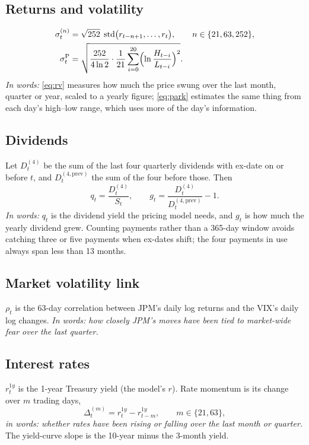 \documentclass[11pt]{article}
\begin{document}
\subsection{Returns and volatility}
\begin{align}
  \sigma^{(n)}_t &= \sqrt{252}\;\operatorname{std}\bigl(r_{t-n+1},\dots,r_t\bigr), \qquad n \in \{21, 63, 252\}, \label{eq:rv}\\
  \sigma^{\mathrm{P}}_t &= \sqrt{\frac{252}{4\ln 2}\cdot\frac{1}{21}\sum_{i=0}^{20}\Bigl(\ln\frac{H_{t-i}}{L_{t-i}}\Bigr)^{2}}. \label{eq:park}
\end{align}
\emph{In words:} \eqref{eq:rv} measures how much the price swung over the last month, quarter or year, scaled to a
yearly figure; \eqref{eq:park} estimates the same thing from each day's high--low range, which uses more of the
day's information.

\subsection{Dividends}
Let $D^{(4)}_t$ be the sum of the last four quarterly dividends with ex-date on or before $t$, and $D^{(4,\text{prev})}_t$
the sum of the four before those. Then
\begin{equation}
  q_t = \frac{D^{(4)}_t}{S_t}, \qquad g_t = \frac{D^{(4)}_t}{D^{(4,\text{prev})}_t} - 1.
\end{equation}
\emph{In words:} $q_t$ is the dividend yield the pricing model needs, and $g_t$ is how much the yearly dividend grew.
Counting payments rather than a 365-day window avoids catching three or five payments when ex-dates shift; the four
payments in use always span less than 13 months.

\subsection{Market volatility link}
$\rho_t$ is the 63-day correlation between JPM's daily log returns and the VIX's daily log changes.
\emph{In words: how closely JPM's moves have been tied to market-wide fear over the last quarter.}

\subsection{Interest rates}
$r^{1y}_t$ is the 1-year Treasury yield (the model's $r$). Rate momentum is its change over $m$ trading days,
\begin{equation}
  \Delta^{(m)}_t = r^{1y}_t - r^{1y}_{t-m}, \qquad m \in \{21, 63\},
\end{equation}
\emph{in words: whether rates have been rising or falling over the last month or quarter.} The yield-curve slope is the
10-year minus the 3-month yield.
\end{document}

